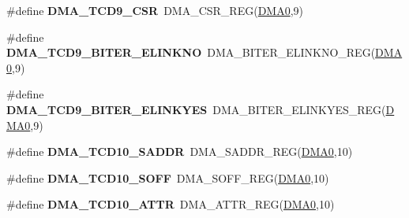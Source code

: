 \begin{DoxyCompactItemize}
\item 
\#define {\bfseries D\+M\+A\+\_\+\+T\+C\+D9\+\_\+\+C\+SR}~D\+M\+A\+\_\+\+C\+S\+R\+\_\+\+R\+EG(\hyperlink{group__DMA__Peripheral__Access__Layer_ga4103044f9ca209772f513dc694513ffb}{D\+M\+A0},9)\hypertarget{group__DMA__Register__Accessor__Macros_ga749263dc7d3a0d1a02d6446098555380}{}\label{group__DMA__Register__Accessor__Macros_ga749263dc7d3a0d1a02d6446098555380}

\item 
\#define {\bfseries D\+M\+A\+\_\+\+T\+C\+D9\+\_\+\+B\+I\+T\+E\+R\+\_\+\+E\+L\+I\+N\+K\+NO}~D\+M\+A\+\_\+\+B\+I\+T\+E\+R\+\_\+\+E\+L\+I\+N\+K\+N\+O\+\_\+\+R\+EG(\hyperlink{group__DMA__Peripheral__Access__Layer_ga4103044f9ca209772f513dc694513ffb}{D\+M\+A0},9)\hypertarget{group__DMA__Register__Accessor__Macros_gad23dc537bb2e195e067b8e949e20f7ed}{}\label{group__DMA__Register__Accessor__Macros_gad23dc537bb2e195e067b8e949e20f7ed}

\item 
\#define {\bfseries D\+M\+A\+\_\+\+T\+C\+D9\+\_\+\+B\+I\+T\+E\+R\+\_\+\+E\+L\+I\+N\+K\+Y\+ES}~D\+M\+A\+\_\+\+B\+I\+T\+E\+R\+\_\+\+E\+L\+I\+N\+K\+Y\+E\+S\+\_\+\+R\+EG(\hyperlink{group__DMA__Peripheral__Access__Layer_ga4103044f9ca209772f513dc694513ffb}{D\+M\+A0},9)\hypertarget{group__DMA__Register__Accessor__Macros_ga256aa9d7f919cfb32f87d4e828ed7771}{}\label{group__DMA__Register__Accessor__Macros_ga256aa9d7f919cfb32f87d4e828ed7771}

\item 
\#define {\bfseries D\+M\+A\+\_\+\+T\+C\+D10\+\_\+\+S\+A\+D\+DR}~D\+M\+A\+\_\+\+S\+A\+D\+D\+R\+\_\+\+R\+EG(\hyperlink{group__DMA__Peripheral__Access__Layer_ga4103044f9ca209772f513dc694513ffb}{D\+M\+A0},10)\hypertarget{group__DMA__Register__Accessor__Macros_ga43def64208954cf8918f00a5c2e8a5c3}{}\label{group__DMA__Register__Accessor__Macros_ga43def64208954cf8918f00a5c2e8a5c3}

\item 
\#define {\bfseries D\+M\+A\+\_\+\+T\+C\+D10\+\_\+\+S\+O\+FF}~D\+M\+A\+\_\+\+S\+O\+F\+F\+\_\+\+R\+EG(\hyperlink{group__DMA__Peripheral__Access__Layer_ga4103044f9ca209772f513dc694513ffb}{D\+M\+A0},10)\hypertarget{group__DMA__Register__Accessor__Macros_ga1785c39374b58b8f0fb1fee6557b8c9e}{}\label{group__DMA__Register__Accessor__Macros_ga1785c39374b58b8f0fb1fee6557b8c9e}

\item 
\#define {\bfseries D\+M\+A\+\_\+\+T\+C\+D10\+\_\+\+A\+T\+TR}~D\+M\+A\+\_\+\+A\+T\+T\+R\+\_\+\+R\+EG(\hyperlink{group__DMA__Peripheral__Access__Layer_ga4103044f9ca209772f513dc694513ffb}{D\+M\+A0},10)\hypertarget{group__DMA__Register__Accessor__Macros_ga4ce82c87fd6f3680ce6c8deceb6653e7}{}\label{group__DMA__Register__Accessor__Macros_ga4ce82c87fd6f3680ce6c8deceb6653e7}


\end{DoxyCompactItemize}
